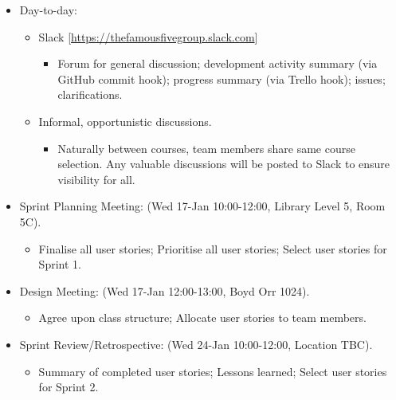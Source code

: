 \documentclass[a4paper, 12pt, titlepage]{article}
\begin{document}
    \begin{itemize}
        \item Day-to-day:
        \begin{itemize}
            \item Slack [\url{https://thefamousfivegroup.slack.com}]
            \begin{itemize}
                \item Forum for general discussion; development activity summary (via GitHub commit hook); progress summary (via Trello hook); issues; clarifications.
            \end{itemize}
        \end{itemize}
        \begin{itemize}
            \item Informal, opportunistic discussions.
            \begin{itemize}
                \item Naturally between courses, team members share same course selection. Any valuable discussions will be posted to Slack to ensure visibility for all.
            \end{itemize}
        \end{itemize}

        \item Sprint Planning Meeting: (Wed 17-Jan 10:00-12:00, Library Level 5, Room 5C).
        \begin{itemize}
                \item Finalise all user stories; Prioritise all user stories; Select user stories for Sprint 1.
        \end{itemize}

        \item Design Meeting: (Wed 17-Jan 12:00-13:00, Boyd Orr 1024).
        \begin{itemize}
                \item Agree upon class structure; Allocate user stories to team members.
        \end{itemize}

        \item Sprint Review/Retrospective: (Wed 24-Jan 10:00-12:00, Location TBC).
        \begin{itemize}
                \item Summary of completed user stories; Lessons learned; Select user stories for Sprint 2.
        \end{itemize}


\end{itemize}
\end{document}
